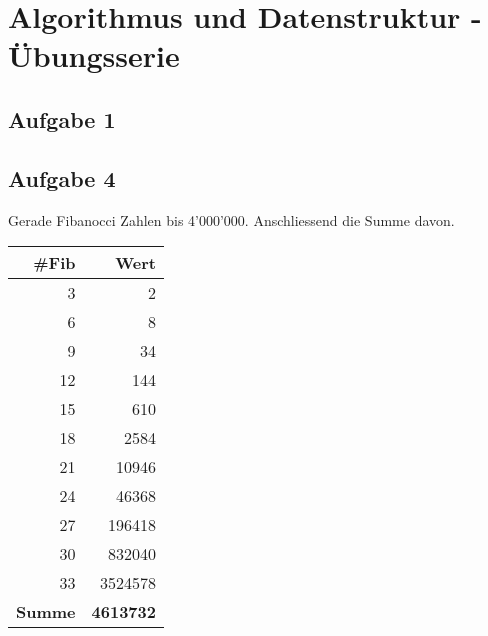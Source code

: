 \chapter*{Algorithmus und Datenstruktur - Übungsserie}

\section*{Aufgabe 1}


\section*{Aufgabe 4}

Gerade Fibanocci Zahlen bis 4'000'000.
Anschliessend die Summe davon.

\begin{center}
\small\renewcommand{\arraystretch}{1.4}
\small
{} %
\begin{tabularx}{0.25\textwidth}{rr}
\rowcolor{tableheadcolor}
\hline
\textbf{\#Fib} & \textbf{Wert} \\
\hline
3 & 2 \\
6 & 8 \\
9 & 34 \\
12 & \num{144} \\
15 & \num{610} \\
18 & \num{2584} \\
21 & \num{10946} \\
24 & \num{46368} \\
27 & \num{196418} \\
30 & \num{832040} \\
33 & \num{3524578} \\
\hline
\rowcolor{tablesubheadcolor}
\textbf{Summe} & \textbf{\num{4613732}}\\
\hline
\end{tabularx}
\end{center}



